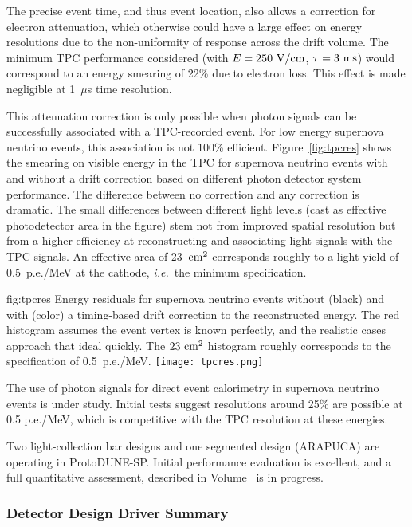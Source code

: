 The precise event time, and thus event location, also allows a 
correction for electron attenuation, which otherwise could have 
a large effect on energy resolutions due to the non-uniformity
of response across the drift volume.  
The minimum TPC performance 
considered (with $E=250~\rm{V/cm}$, $\tau=3~\rm{ms}$) would 
correspond to an energy smearing of 22\% due to electron loss.  
This effect is made negligible at 1~$\mu$s time resolution.

This attenuation correction is only possible when photon signals can be successfully associated with a TPC-recorded event.  For low energy supernova neutrino events, this association is not 
100\% efficient.  Figure~\ref{fig:tpcres} shows the smearing on visible energy in the TPC for supernova neutrino events with and without a drift correction based on different photon detector system performance.  The difference between no correction and any correction is dramatic.  The small differences between different light levels (cast as effective photodetector area in the figure) stem not from improved spatial resolution but from a higher efficiency at reconstructing and associating light signals with the TPC signals.  An effective area of 23~$\rm{cm}^2$ corresponds roughly to a light yield of 0.5~p.e./MeV at the cathode, {\em i.e.}\ the minimum specification.
%
\begin{dunefigure}
{fig:tpcres}
{Energy residuals for supernova neutrino events without (black) 
and with (color) a timing-based drift correction to the 
reconstructed energy.  The red histogram assumes the event 
vertex is known perfectly, and the realistic cases approach that
ideal quickly.  The $23~\rm{cm}^2$ histogram roughly corresponds 
to the specification of 0.5~p.e./MeV.}
  \texttt{[image: tpcres.png]}
\end{dunefigure}

The use of photon signals for direct event calorimetry in 
supernova neutrino events is under study. Initial tests suggest 
resolutions around 25\% are possible at 0.5 p.e./MeV, which is
competitive with the TPC resolution at these energies.

Two light-collection bar designs and one segmented design 
(ARAPUCA) are operating in ProtoDUNE-SP.  Initial performance 
evaluation is excellent, and a full quantitative assessment, 
described in Volume~\volnumbersp{} 
is in progress.

\subsubsection{Detector Design Driver Summary}

